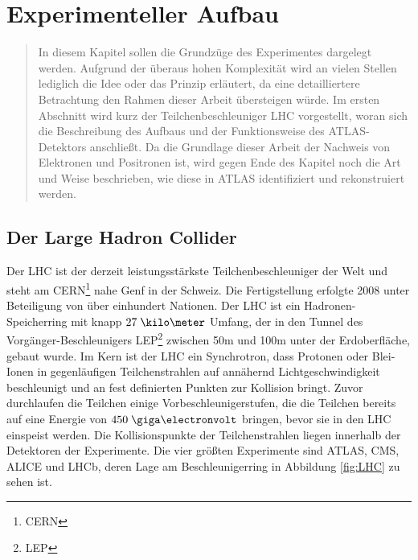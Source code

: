 
\chapter{Experimenteller Aufbau}
\label{experimenteller_aufbau}

\begin{quote}
    In diesem Kapitel sollen die Grundzüge des Experimentes dargelegt werden.
    Aufgrund der überaus hohen Komplexität wird an vielen Stellen lediglich die
    Idee oder das Prinzip erläutert, da eine detailliertere Betrachtung den
    Rahmen dieser Arbeit übersteigen würde. Im ersten Abschnitt wird kurz der
    Teilchenbeschleuniger \acs{LHC} vorgestellt, woran sich die Beschreibung
    des Aufbaus und der Funktionsweise des ATLAS-Detektors anschließt. Da die
    Grundlage dieser Arbeit der Nachweis von Elektronen und Positronen ist,
    wird gegen Ende des Kapitel noch die Art und Weise beschrieben, wie diese
    in ATLAS identifiziert und rekonstruiert werden.
\end{quote}



%
\section{Der Large Hadron Collider}
\label{lhc}

Der \acf{LHC} ist der derzeit leistungsstärkste Teilchenbeschleuniger der Welt
und steht am CERN\footnote{\acf{CERN}} nahe Genf in der Schweiz. Die
Fertigstellung erfolgte 2008 unter Beteiligung von über einhundert Nationen.
Der \ac{LHC} ist ein Hadronen-Speicherring mit knapp $27\;\kilo\meter$ Umfang,
der in den Tunnel des Vorgänger-Beschleunigers LEP\footnote{\acf{LEP}} zwischen
50m und 100m unter der Erdoberfläche, gebaut wurde. Im Kern ist der
\ac{LHC} ein Synchrotron, dass Protonen oder Blei-Ionen in gegenläufigen
Teilchenstrahlen auf annähernd Lichtgeschwindigkeit beschleunigt und an
fest definierten Punkten zur Kollision bringt. Zuvor durchlaufen die Teilchen
einige Vorbeschleunigerstufen, die die Teilchen bereits auf eine Energie von
$450\GeV$ bringen, bevor sie in den \ac{LHC} einspeist werden. Die
Kollisionspunkte der Teilchenstrahlen liegen innerhalb der Detektoren der
Experimente. Die vier größten Experimente sind \acs{ATLAS}, CMS, ALICE und
LHCb, deren Lage am Beschleunigerring in Abbildung \ref{fig:LHC} zu sehen ist.

